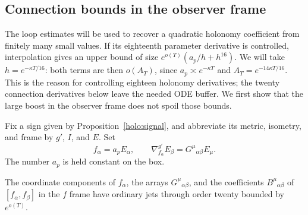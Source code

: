 \subsection{Connection bounds in the observer frame}

The loop estimates will be used to recover a quadratic holonomy
coefficient from finitely many small values. If its eighteenth
parameter derivative is controlled, interpolation gives an upper
bound of size $e^{o(T)}(a_p/h+h^{16})$. We will take
$h=e^{-\kappa T/16}$: both terms are then $o(A_T)$, since
$a_p\asymp e^{-\kappa T}$ and $A_T=e^{-14\kappa T/16}$.
This is the reason for controlling eighteen holonomy derivatives;
the twenty connection derivatives below leave the needed ODE buffer.
We first show that the large boost in the observer frame does not
spoil those bounds.

Fix a sign given by Proposition~\ref{holo:signal}, and abbreviate
its metric, isometry, and frame by $g'$, $I$, and $E$.  Set
\begin{equation}\label{holo:loop-frame}
 f_\alpha=a_pE_\alpha,\qquad
 \nabla^{g'}_{f_\alpha}E_\beta
        =G^\mu{}_{\alpha\beta}E_\mu.
\end{equation}
The number $a_p$ is held constant on the box.

\begin{lemma}
\label{holo:boosted-control}
The coordinate components of $f_\alpha$, the arrays
$G^\mu{}_{\alpha\beta}$, and the coefficients
$B^\mu{}_{\alpha\beta}$ of $[f_\alpha,f_\beta]$ in the $f$
frame have ordinary jets through order twenty bounded by $e^{o(T)}$.
\end{lemma}

